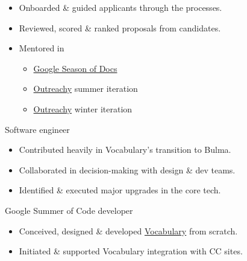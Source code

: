 \begin{sectiondescription}
  \begin{itemize}[nosep, leftmargin = *]
    \item Onboarded \& guided applicants through the processes.
    \item Reviewed, scored \& ranked proposals from candidates.
    \item Mentored in
    \begin{itemize}[nosep, leftmargin = *, label = {-}]
      \item \href{https://developers.google.com/season-of-docs}{Google Season of Docs} \hfill \textcolor{secondary}{}
      \item \href{https://outreachy.org/}{Outreachy} summer iteration \hfill \textcolor{secondary}{}
      \item \href{https://outreachy.org/}{Outreachy} winter iteration \hfill \textcolor{secondary}{}
    \end{itemize}
  \end{itemize}
\end{sectiondescription}

\rolesubsubsection
  {Software engineer}
  {}

\begin{sectiondescription}
  \begin{itemize}[nosep, leftmargin = *]
    \item Contributed heavily in Vocabulary's transition to Bulma.
    \item Collaborated in decision-making with design \& dev teams.
    \item Identified \& executed major upgrades in the core tech.
  \end{itemize}
\end{sectiondescription}

\rolesubsubsection
  {Google Summer of Code developer}
  {}

\begin{sectiondescription}
  \begin{itemize}[nosep, leftmargin = *]
    \item Conceived, designed \& developed \href{https://opensource.creativecommons.org/vocabulary/}{Vocabulary} from scratch.
    \item Initiated \& supported Vocabulary integration with CC sites.
  \end{itemize}
\end{sectiondescription}

